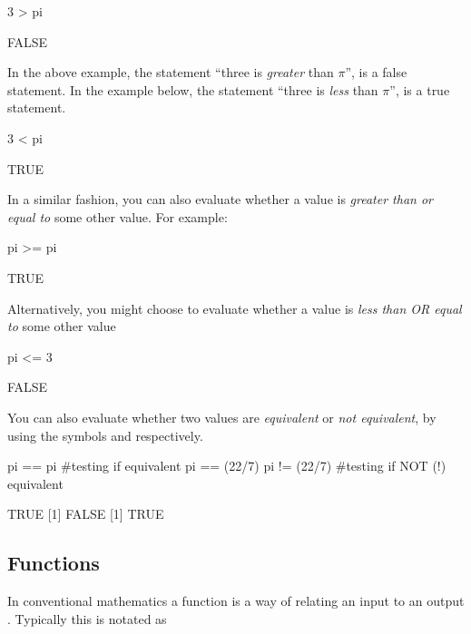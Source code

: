 

\begin{inR}
3 > pi
\end{inR}
\begin{outR}
[1] FALSE
\end{outR}

\noindent
In the above example, the statement ``three is \textit{greater} than $\pi$'', is a false statement.  In the example below, the statement ``three is \textit{less} than $\pi$'', is a true statement.

\begin{inR}
3 < pi
\end{inR}
\begin{outR}
[1] TRUE
\end{outR}

\noindent
In a similar fashion, you can also evaluate whether a value is \textit{greater than or equal to} some other value. For example:

\begin{inR}
pi >= pi
\end{inR}
\begin{outR}
[1] TRUE
\end{outR}

\noindent
Alternatively, you might choose to evaluate whether a value is \textit{less than OR equal to} some other value

\begin{inR}
pi <= 3
\end{inR}
\begin{outR}
[1] FALSE
\end{outR}

\noindent
You can also evaluate whether two values are \textit{equivalent} or \textit{not equivalent}, by using the symbols \R{==} and \R{!=} respectively.

\begin{inR}
pi == pi #testing if equivalent
pi == (22/7)
pi != (22/7) #testing if NOT (!) equivalent
\end{inR}
\begin{outR}
[1] TRUE
[1] FALSE
[1] TRUE
\end{outR}


\subsection{Functions}
\label{sec:functions}

In conventional mathematics a function is a way of relating an input to an output \parencite{Pierce2022}.  Typically this is notated as

